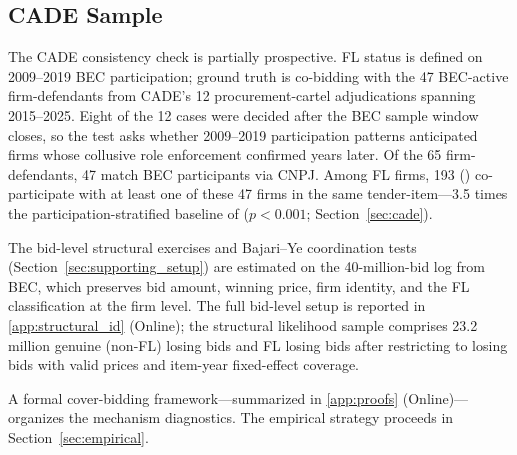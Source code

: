 \subsection{CADE Sample}
\label{sec:cade_sample}

The CADE consistency check is partially prospective. FL status
is defined on 2009--2019 BEC participation; ground truth is
co-bidding with the 47 BEC-active firm-defendants from CADE's
12 procurement-cartel adjudications spanning 2015--2025.
Eight of the 12 cases were decided after the BEC sample window
closes, so the test asks whether 2009--2019 participation
patterns anticipated firms whose collusive role enforcement
confirmed years later. Of the 65 firm-defendants, 47 match BEC
participants via CNPJ. Among \valFL FL firms, 193 (\valCobidShareFL)
co-participate with at least one of these 47 firms in the same
tender-item---3.5 times the participation-stratified baseline
of \valCADEbase ($p < 0.001$; Section~\ref{sec:cade}).

The bid-level structural exercises and Bajari--Ye coordination
tests (Section~\ref{sec:supporting_setup}) are estimated on the
40-million-bid log from BEC, which preserves bid amount,
winning price, firm identity, and the FL classification at the
firm level. The full bid-level setup is reported in
\ref{app:structural_id} (Online); the structural likelihood
sample comprises 23.2 million genuine (non-FL) losing bids and
\valItemsCount FL losing bids after restricting to losing bids with
valid prices and item-year fixed-effect coverage.

A formal cover-bidding framework---summarized in
\ref{app:proofs} (Online)---organizes the mechanism diagnostics.
The empirical strategy proceeds in Section~\ref{sec:empirical}.
